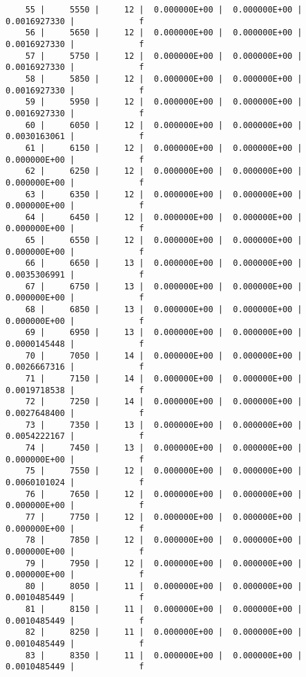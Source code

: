\documentclass[
  authoryear,
  preprint,
  3p]{elsarticle}
\begin{document}
\begin{verbatim}
    55 |     5550 |     12 |  0.000000E+00 |  0.000000E+00 |  0.0016927330 |             f
    56 |     5650 |     12 |  0.000000E+00 |  0.000000E+00 |  0.0016927330 |             f
    57 |     5750 |     12 |  0.000000E+00 |  0.000000E+00 |  0.0016927330 |             f
    58 |     5850 |     12 |  0.000000E+00 |  0.000000E+00 |  0.0016927330 |             f
    59 |     5950 |     12 |  0.000000E+00 |  0.000000E+00 |  0.0016927330 |             f
    60 |     6050 |     12 |  0.000000E+00 |  0.000000E+00 |  0.0030163061 |             f
    61 |     6150 |     12 |  0.000000E+00 |  0.000000E+00 |  0.000000E+00 |             f
    62 |     6250 |     12 |  0.000000E+00 |  0.000000E+00 |  0.000000E+00 |             f
    63 |     6350 |     12 |  0.000000E+00 |  0.000000E+00 |  0.000000E+00 |             f
    64 |     6450 |     12 |  0.000000E+00 |  0.000000E+00 |  0.000000E+00 |             f
    65 |     6550 |     12 |  0.000000E+00 |  0.000000E+00 |  0.000000E+00 |             f
    66 |     6650 |     13 |  0.000000E+00 |  0.000000E+00 |  0.0035306991 |             f
    67 |     6750 |     13 |  0.000000E+00 |  0.000000E+00 |  0.000000E+00 |             f
    68 |     6850 |     13 |  0.000000E+00 |  0.000000E+00 |  0.000000E+00 |             f
    69 |     6950 |     13 |  0.000000E+00 |  0.000000E+00 |  0.0000145448 |             f
    70 |     7050 |     14 |  0.000000E+00 |  0.000000E+00 |  0.0026667316 |             f
    71 |     7150 |     14 |  0.000000E+00 |  0.000000E+00 |  0.0019718538 |             f
    72 |     7250 |     14 |  0.000000E+00 |  0.000000E+00 |  0.0027648400 |             f
    73 |     7350 |     13 |  0.000000E+00 |  0.000000E+00 |  0.0054222167 |             f
    74 |     7450 |     13 |  0.000000E+00 |  0.000000E+00 |  0.000000E+00 |             f
    75 |     7550 |     12 |  0.000000E+00 |  0.000000E+00 |  0.0060101024 |             f
    76 |     7650 |     12 |  0.000000E+00 |  0.000000E+00 |  0.000000E+00 |             f
    77 |     7750 |     12 |  0.000000E+00 |  0.000000E+00 |  0.000000E+00 |             f
    78 |     7850 |     12 |  0.000000E+00 |  0.000000E+00 |  0.000000E+00 |             f
    79 |     7950 |     12 |  0.000000E+00 |  0.000000E+00 |  0.000000E+00 |             f
    80 |     8050 |     11 |  0.000000E+00 |  0.000000E+00 |  0.0010485449 |             f
    81 |     8150 |     11 |  0.000000E+00 |  0.000000E+00 |  0.0010485449 |             f
    82 |     8250 |     11 |  0.000000E+00 |  0.000000E+00 |  0.0010485449 |             f
    83 |     8350 |     11 |  0.000000E+00 |  0.000000E+00 |  0.0010485449 |             f

\end{verbatim}
\end{document}
